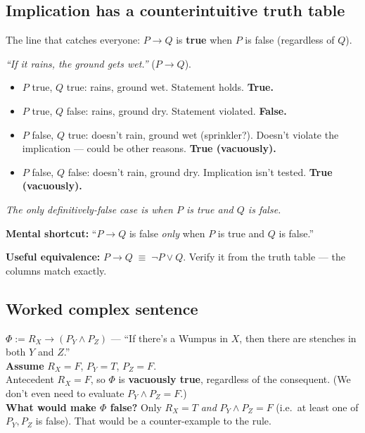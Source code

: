 \documentclass[11pt, a4paper]{article}
\begin{document}
\subsection{Implication has a counterintuitive truth table}

The line that catches everyone: $P \rightarrow Q$ is \textbf{true} when $P$ is false (regardless of $Q$).

\begin{exbox}
\textit{``If it rains, the ground gets wet.''} ($P \rightarrow Q$).\\[0.3em]
\begin{itemize}[leftmargin=*, itemsep=0pt, topsep=0pt]
  \item $P$ true, $Q$ true: rains, ground wet. Statement holds. \textbf{True.}
  \item $P$ true, $Q$ false: rains, ground dry. Statement violated. \textbf{False.}
  \item $P$ false, $Q$ true: doesn't rain, ground wet (sprinkler?). Doesn't violate the implication — could be other reasons. \textbf{True (vacuously).}
  \item $P$ false, $Q$ false: doesn't rain, ground dry. Implication isn't tested. \textbf{True (vacuously).}
\end{itemize}
\textit{The only definitively-false case is when $P$ is true and $Q$ is false.}
\end{exbox}

\textbf{Mental shortcut:} ``$P \rightarrow Q$ is false \emph{only} when $P$ is true and $Q$ is false.''

\textbf{Useful equivalence:} $P \rightarrow Q \;\equiv\; \neg P \lor Q$. Verify it from the truth table — the columns match exactly.

\subsection{Worked complex sentence}

\begin{exbox}
$\Phi := R_X \rightarrow (P_Y \land P_Z)$ — ``If there's a Wumpus in $X$, then there are stenches in both $Y$ and $Z$.''\\[0.3em]
\textbf{Assume} $R_X = F$, $P_Y = T$, $P_Z = F$.\\[0.3em]
Antecedent $R_X = F$, so $\Phi$ is \textbf{vacuously true}, regardless of the consequent. (We don't even need to evaluate $P_Y \land P_Z = F$.)\\[0.3em]
\textbf{What would make $\Phi$ false?} Only $R_X = T$ \emph{and} $P_Y \land P_Z = F$ (i.e.\ at least one of $P_Y, P_Z$ is false). That would be a counter-example to the rule.
\end{exbox}
\end{document}
